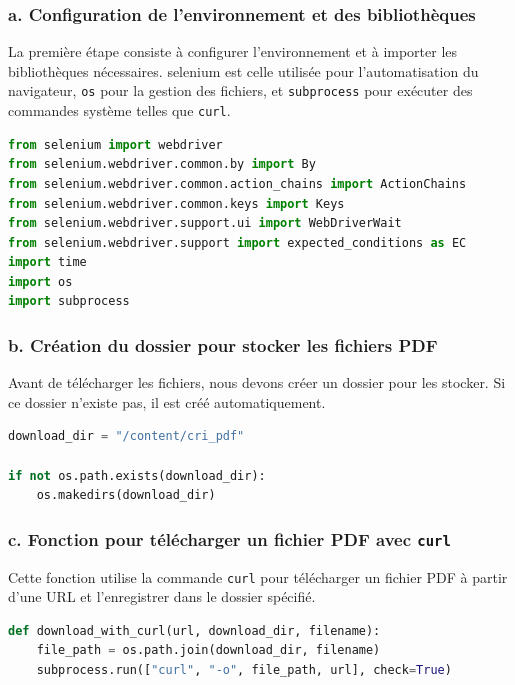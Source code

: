 \subsubsection{a. Configuration de l'environnement et des bibliothèques}

La première étape consiste à configurer l'environnement et à importer les bibliothèques nécessaires. \gls{selenium} est celle utilisée pour l'automatisation du navigateur, \texttt{os} pour la gestion des fichiers, et \texttt{subprocess} pour exécuter des commandes système telles que \texttt{curl}.

\begin{lstlisting}[language=Python]
from selenium import webdriver
from selenium.webdriver.common.by import By
from selenium.webdriver.common.action_chains import ActionChains
from selenium.webdriver.common.keys import Keys
from selenium.webdriver.support.ui import WebDriverWait
from selenium.webdriver.support import expected_conditions as EC
import time
import os
import subprocess
\end{lstlisting}

\subsubsection{b. Création du dossier pour stocker les fichiers PDF}

Avant de télécharger les fichiers, nous devons créer un dossier pour les stocker. Si ce dossier n'existe pas, il est créé automatiquement.

\begin{lstlisting}[language=Python]
download_dir = "/content/cri_pdf"

if not os.path.exists(download_dir):
    os.makedirs(download_dir)
\end{lstlisting}

\subsubsection{c. Fonction pour télécharger un fichier PDF avec \texttt{curl}}

Cette fonction utilise la commande \texttt{curl} pour télécharger un fichier PDF à partir d'une URL et l'enregistrer dans le dossier spécifié.

\begin{lstlisting}[language=Python]
def download_with_curl(url, download_dir, filename):
    file_path = os.path.join(download_dir, filename)
    subprocess.run(["curl", "-o", file_path, url], check=True)
\end{lstlisting}

